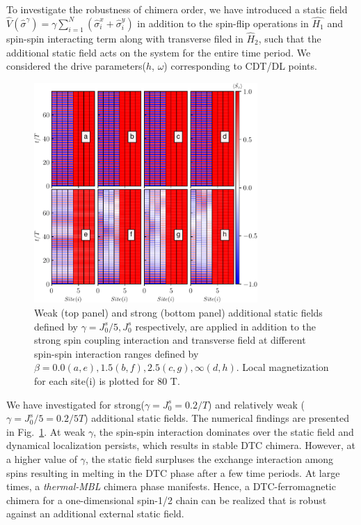 \documentclass[%
nofootinbib,
reprint,
superscriptaddress,
amsmath,amssymb,showkeys,
aps,
prb,
]{revtex4-2}
\begin{document}
	To investigate the robustness of chimera order, we have introduced a static field $\displaystyle \hat{V}(\hat{\sigma}^\gamma) =\gamma \sum_{i=1}^{N} (\hat{\sigma}^x_i + \hat{\sigma}^y_i)$ in addition to the spin-flip operations in $\hat{H_1}$ and spin-spin interacting term along with transverse filed in $\hat{H}_2$, such that the additional static field acts on the system for the entire time period. We considered the drive parameters($h$, $\omega$) corresponding to CDT/DL points.
	\begin{figure}
		\begin{center}
			\includegraphics[width=8.5cm]{robustness_N_8.pdf}
		\end{center}
		\caption{Weak (top panel) and strong (bottom panel) additional static fields defined by $\gamma = J_0^s/5, J_0^s$ respectively, are applied in addition to the strong spin coupling interaction and transverse field at different spin-spin interaction ranges defined by $\beta = 0.0 (a,e), 1.5(b,f), 2.5(c,g), \infty(d,h)$. Local magnetization for each site(i) is plotted for 80 T.}
		\label{Fig:robustness}
	\end{figure}
	We have investigated for strong($\displaystyle \gamma= J_0^s=0.2/T$) and relatively weak ($\displaystyle \gamma= J_0^s/5=0.2/5T$) additional static fields. The numerical findings are presented in Fig.~\ref{Fig:robustness}. At weak $\gamma$, the spin-spin interaction dominates over the static field and dynamical localization persists, which results in stable DTC chimera. However, at a higher value of $\gamma$, the static field surpluses the exchange interaction among spins resulting in melting in  the DTC phase after a few time periods. At large times, a \textit{thermal-MBL} chimera phase manifests. Hence, a DTC-ferromagnetic chimera for a one-dimensional spin-1/2 chain can be realized that is robust against an additional external static field.	
	
\end{document}
